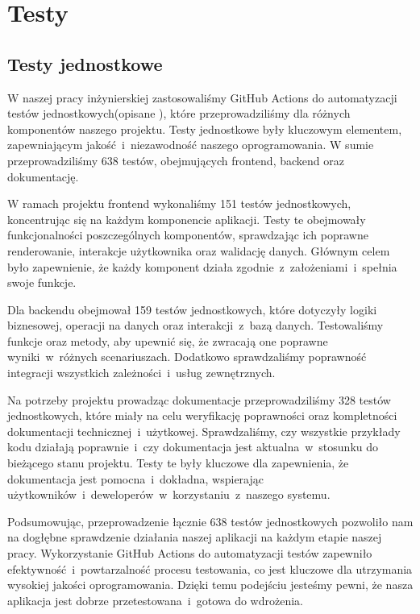 
\chapter{Testy}
\label{ch:testy}

\section{Testy jednostkowe}
\label{sec:testy-jednostkowe}
W naszej pracy inżynierskiej zastosowaliśmy GitHub Actions do automatyzacji testów jednostkowych(opisane \pageref{sec:github-actions} ), które przeprowadziliśmy dla różnych komponentów naszego projektu.
Testy jednostkowe były kluczowym elementem, zapewniającym jakość~i~niezawodność naszego oprogramowania. 
W sumie przeprowadziliśmy 638 testów, obejmujących frontend, backend oraz dokumentację.\newline

\indent W ramach projektu frontend wykonaliśmy 151 testów jednostkowych, koncentrując się na każdym komponencie aplikacji. Testy te obejmowały funkcjonalności poszczególnych 
komponentów, sprawdzając ich poprawne renderowanie, interakcje użytkownika oraz walidację danych. Głównym celem było zapewnienie, że każdy komponent działa zgodnie~z~założeniami~i~spełnia swoje funkcje.\newline

\indent Dla backendu obejmował 159 testów jednostkowych, które dotyczyły logiki biznesowej, operacji na danych oraz interakcji~z~bazą danych. 
Testowaliśmy funkcje oraz metody, aby upewnić się, że zwracają one poprawne wyniki~w~różnych scenariuszach. Dodatkowo sprawdzaliśmy poprawność integracji wszystkich zależności~i~usług zewnętrznych.\newline

\indent Na potrzeby projektu prowadząc dokumentacje przeprowadziliśmy 328 testów jednostkowych, które miały na celu weryfikację poprawności oraz kompletności dokumentacji technicznej~i~użytkowej.
 Sprawdzaliśmy, czy wszystkie przykłady kodu działają poprawnie~i~czy dokumentacja jest aktualna~w~stosunku do bieżącego stanu projektu. Testy te były kluczowe dla zapewnienia, że dokumentacja 
 jest pomocna~i~dokładna, wspierając użytkowników~i~deweloperów~w~korzystaniu~z~naszego systemu.\newline

 \indent Podsumowując, przeprowadzenie łącznie 638 testów jednostkowych pozwoliło nam na dogłębne sprawdzenie działania naszej aplikacji na każdym etapie naszej pracy. 
Wykorzystanie GitHub Actions do automatyzacji testów zapewniło efektywność~i~powtarzalność procesu testowania, co jest kluczowe dla utrzymania wysokiej jakości oprogramowania. 
Dzięki temu podejściu jesteśmy pewni, że nasza aplikacja jest dobrze przetestowana~i~gotowa do wdrożenia.\newline


